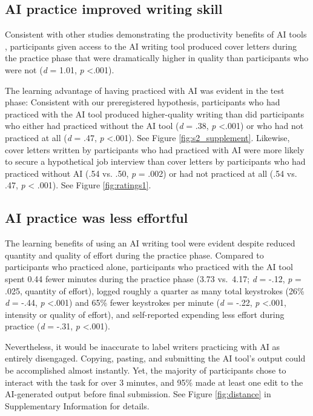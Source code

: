 \documentclass[11pt]{report}
\begin{document}
\begin{mainf}
\subsection*{AI practice improved writing skill}

Consistent with other studies demonstrating the productivity benefits of
AI tools \cite{dellacqua2023, noy2023}, participants given access to the
AI writing tool produced cover letters during the practice phase that
were dramatically higher in quality than participants who were not
(\emph{d} = 1.01, \emph{p} \textless.001).

The learning advantage of having practiced with AI was evident in the
test phase: Consistent with our preregistered hypothesis, participants
who had practiced with the AI tool produced higher-quality writing than did
participants who either had practiced without the AI tool (\emph{d} = .38,
\emph{p} \textless.001) or who had not practiced at all (\emph{d} = .47,
\emph{p} \textless.001). See Figure \ref{fig:s2_supplement}.
Likewise, cover letters written by participants who had practiced with AI were more likely to secure a hypothetical job interview than cover letters by participants who had practiced without AI (.54 vs. .50, \textit{p} = .002) or had not practiced at all (.54 vs. .47, \textit{p} < .001). See Figure \ref{fig:ratings1}. %



\subsection*{AI practice was less effortful}

The learning benefits of using an AI writing tool were evident
despite reduced quantity and quality of effort during the practice phase. Compared to
participants who practiced alone, participants who practiced with the AI
tool spent 0.44 fewer minutes during the practice phase (3.73 vs.~4.17;
\emph{d} = -.12, \emph{p} = .025, quantity of effort), logged roughly a quarter as many total
keystrokes (26\% \emph{d} = -.44, \emph{p} \textless.001) and 65\% fewer keystrokes per minute (\emph{d} = -.22, \emph{p} \textless.001, intensity or quality of effort),  and
self-reported expending less effort during practice (\emph{d} = -.31,
\emph{p} \textless.001).

Nevertheless, it would be inaccurate to label writers practicing with AI as entirely disengaged. 
  Copying, pasting, and submitting the AI tool's output could be accomplished almost instantly. 
  Yet, the majority of participants chose to interact with the task for over 3 minutes, and 95\% made at least one edit to the AI-generated output before final submission. See Figure \ref{fig:distance} in Supplementary Information for details.


\end{mainf}
\end{document}
